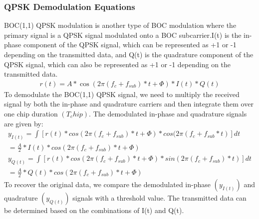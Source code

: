 \documentclass[onecolumn]{article}
\providecommand{\sbrak}[1]{\ensuremath{{}\left[#1\right]}}
\begin{document}
\begin{enumerate}
\begin{Large}
\subsubsection{QPSK Demodulation Equations}
BOC(1,1) QPSK modulation is another type of BOC modulation where the primary signal is a QPSK signal modulated onto a BOC subcarrier.I(t) is the in-phase component of the QPSK signal, which can be represented as +1 or -1 depending on the transmitted data, and Q(t) is the quadrature component of the QPSK signal, which can also be represented as +1 or -1 depending on the transmitted data.
\begin{align}
r(t) = A * \cos(2\pi(f_c + f_{sub}) * t + \Phi) * I(t) * Q(t)
\end{align}
To demodulate the BOC(1,1) QPSK signal, we need to multiply the received signal by both the in-phase and quadrature carriers and then integrate them over one chip duration $(T_chip)$. The demodulated in-phase and quadrature signals are given by:
\begin{align}
y_{I(t)} = \int\sbrak{r(t) * cos(2\pi(f_c + f_{sub}) * t + \Phi) * cos(2\pi(f_c + f_{sub} * t)} dt\\
= \frac{A}{2} * I(t) * cos(2\pi(f_c + f_{sub}) * t + \Phi)\\
y_{Q(t)} = \int\sbrak{r(t) * cos(2\pi(f_c + f_{sub}) * t + \Phi) * sin(2\pi(f_c + f_{sub}) * t)} dt\\
= \frac{A}{2} * Q(t) * cos(2\pi(f_c + f_{sub}) * t + \Phi)
\end{align}
To recover the original data, we compare the demodulated in-phase $(y_{I(t)})$ and quadrature $(y_{Q(t)})$ signals with a threshold value. The transmitted data can be determined based on the combinations of I(t) and Q(t).
\end{Large}

\end{enumerate}
\end{document}

